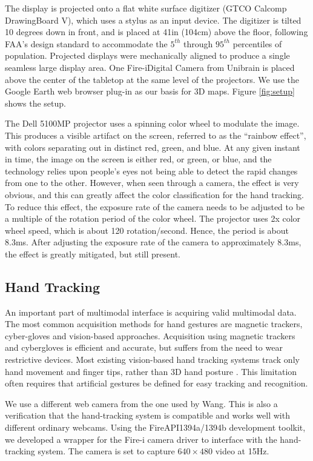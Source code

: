 The display is projected onto a flat white surface digitizer (GTCO Calcomp DrawingBoard V), which uses a stylus as an input device. The digitizer is tilted 10 degrees down in front, and is placed at 41in (104cm) above the floor, following FAA's design standard to accommodate the $5^{th}$ through $95^{th}$ percentiles of population. Projected displays were mechanically aligned to produce a single seamless large display area. One Fire-i\texttrademark Digital Camera from Unibrain is placed above the center of the tabletop at the same level of the projectors. We use the Google Earth web browser plug-in as our basis for 3D maps. Figure \ref{fig:setup} shows the setup.

The Dell 5100MP projector uses a spinning color wheel to modulate the image. This produces a visible artifact on the screen, referred to as the ``rainbow effect'', with colors separating out in distinct red, green, and blue. At any given instant in time, the image on the screen is either red, or green, or blue, and the technology relies upon people's eyes not being able to detect the rapid changes from one to the other. However, when seen through a camera, the effect is very obvious, and this can greatly affect the color classification for the hand tracking. To reduce this effect, the exposure rate of the camera needs to be adjusted to be a multiple of the rotation period of the color wheel. The projector uses 2x color wheel speed, which is about 120 rotation/second. Hence, the period is about 8.3ms. After adjusting the exposure rate of the camera to approximately 8.3ms, the effect is greatly mitigated, but still present. 

\subsection{Hand Tracking}
An important part of multimodal interface is acquiring valid multimodal data. The most common acquisition methods for hand gestures are magnetic trackers, cyber-gloves and vision-based approaches. Acquisition using magnetic trackers and cybergloves is efficient and accurate, but suffers from the need to wear restrictive devices. Most existing vision-based hand tracking systems track only hand movement and finger tips, rather than 3D hand posture \cite{Demirdjian03}\cite{Oka02}\cite{Rauschert02}. This limitation often requires that artificial gestures be defined for easy tracking and recognition.  

We use a different web camera from the one used by Wang. This is also a verification that the hand-tracking system is compatible and works well with different ordinary webcams. Using the FireAPI\texttrademark 1394a/1394b development toolkit, we developed a wrapper for the Fire-i camera driver to interface with the hand-tracking system. The camera is set to capture $640 \times 480$ video at 15Hz.  

